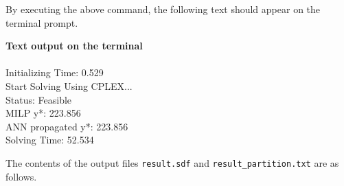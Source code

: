 \documentclass[11pt, titlepage, dvipdfmx, twoside]{article}
\begin{document}
By executing the above command, the following text should appear on the terminal prompt.

\bigskip

\begin{oframed}
{\bf Text output on the terminal}\\\\
 Initializing Time: 0.529  \\
Start Solving Using CPLEX...\\
Status: Feasible 		\\
MILP y*: 223.856 		\\
ANN propagated y*: 223.856 \\
Solving Time: 52.534       
\end{oframed}

The contents of the output files {\tt result.sdf} and
{\tt result\_partition.txt} are as follows.

\bigskip
\end{document}
